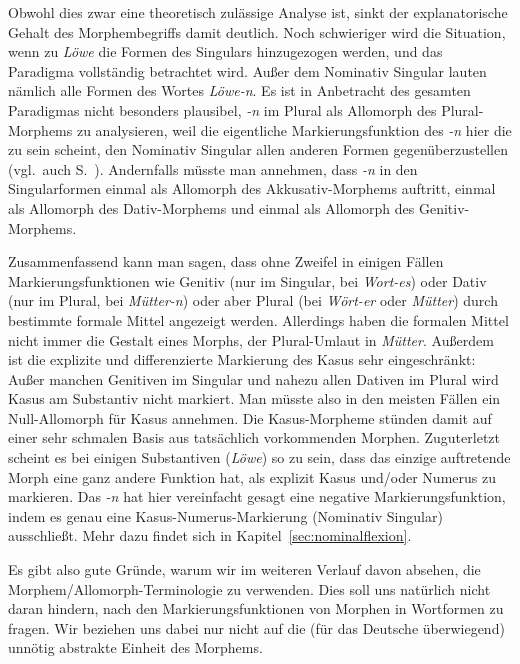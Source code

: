 \begin{exe}
\end{exe}

Obwohl dies zwar eine theoretisch zulässige Analyse ist, sinkt der explanatorische Gehalt des Morphembegriffs damit deutlich.
Noch schwieriger wird die Situation, wenn zu \textit{Löwe} die Formen des Singulars hinzugezogen werden, und das Paradigma vollständig betrachtet wird.
Außer dem Nominativ Singular lauten nämlich alle Formen des Wortes \textit{Löwe-n}.
Es ist in Anbetracht des gesamten Paradigmas nicht besonders plausibel, \textit{-n} im Plural als Allomorph des Plural-Morphems zu analysieren, weil die eigentliche Markierungsfunktion des \textit{-n} hier die zu sein scheint, den Nominativ Singular allen anderen Formen gegenüberzustellen (vgl.\ auch S.~\pageref{abs:4578239547}).
Andernfalls müsste man annehmen, dass \textit{-n} in den Singularformen einmal als Allomorph des Akkusativ-Morphems auftritt, einmal als Allomorph des Dativ-Morphems und einmal als Allomorph des Genitiv-Morphems.


Zusammenfassend kann man sagen, dass ohne Zweifel in einigen Fällen Markierungsfunktionen wie Genitiv (nur im Singular, \zB bei \textit{Wort-es}) oder Dativ (nur im Plural, \zB bei \textit{Mütter-n}) oder aber Plural (\zB bei \textit{Wört-er} oder \textit{Mütter}) durch bestimmte formale Mittel angezeigt werden.
Allerdings haben die formalen Mittel nicht immer die Gestalt eines Morphs, \zB der Plural-Umlaut in \textit{Mütter}.
Außerdem ist die explizite und differenzierte Markierung des Kasus sehr eingeschränkt:
Außer manchen Genitiven im Singular und nahezu allen Dativen im Plural wird Kasus am Substantiv nicht markiert.
Man müsste also in den meisten Fällen ein Null-Allomorph für Kasus annehmen.
Die Kasus-Morpheme stünden damit auf einer sehr schmalen Basis aus tatsächlich vorkommenden Morphen.
Zuguterletzt scheint es bei einigen Substantiven (\zB \textit{Löwe}) so zu sein, dass das einzige auftretende Morph eine ganz andere Funktion hat, als explizit Kasus und\slash oder Numerus zu markieren.
Das \textit{-n} hat hier vereinfacht gesagt eine negative Markierungsfunktion, indem es genau eine Kasus-Numerus-Markierung (Nominativ Singular) ausschließt.
Mehr dazu findet sich in Kapitel~\ref{sec:nominalflexion}.

Es gibt also gute Gründe, warum wir im weiteren Verlauf davon absehen, die Morphem\slash Allomorph-Terminologie zu verwenden.
Dies soll uns natürlich nicht daran hindern, nach den Markierungsfunktionen von Morphen in Wortformen zu fragen.
Wir beziehen uns dabei nur nicht auf die (für das Deutsche überwiegend) unnötig abstrakte Einheit des Morphems.


